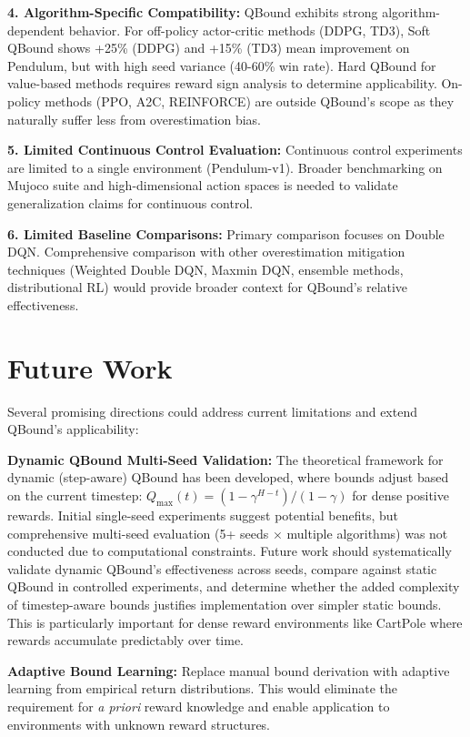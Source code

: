 \documentclass[11pt]{article}
\theoremstyle{definition}
\theoremstyle{remark}
\begin{document}
\textbf{4. Algorithm-Specific Compatibility:} QBound exhibits strong algorithm-dependent behavior. For off-policy actor-critic methods (DDPG, TD3), Soft QBound shows +25\% (DDPG) and +15\% (TD3) mean improvement on Pendulum, but with high seed variance (40-60\% win rate). Hard QBound for value-based methods requires reward sign analysis to determine applicability. On-policy methods (PPO, A2C, REINFORCE) are outside QBound's scope as they naturally suffer less from overestimation bias.

\textbf{5. Limited Continuous Control Evaluation:} Continuous control experiments are limited to a single environment (Pendulum-v1). Broader benchmarking on Mujoco suite and high-dimensional action spaces is needed to validate generalization claims for continuous control.

\textbf{6. Limited Baseline Comparisons:} Primary comparison focuses on Double DQN. Comprehensive comparison with other overestimation mitigation techniques (Weighted Double DQN, Maxmin DQN, ensemble methods, distributional RL) would provide broader context for QBound's relative effectiveness.

\section{Future Work}

Several promising directions could address current limitations and extend QBound's applicability:

\textbf{Dynamic QBound Multi-Seed Validation:} The theoretical framework for dynamic (step-aware) QBound has been developed, where bounds adjust based on the current timestep: $Q_{\max}(t) = (1-\gamma^{H-t})/(1-\gamma)$ for dense positive rewards. Initial single-seed experiments suggest potential benefits, but comprehensive multi-seed evaluation (5+ seeds $\times$ multiple algorithms) was not conducted due to computational constraints. Future work should systematically validate dynamic QBound's effectiveness across seeds, compare against static QBound in controlled experiments, and determine whether the added complexity of timestep-aware bounds justifies implementation over simpler static bounds. This is particularly important for dense reward environments like CartPole where rewards accumulate predictably over time.

\textbf{Adaptive Bound Learning:} Replace manual bound derivation with adaptive learning from empirical return distributions. This would eliminate the requirement for \textit{a priori} reward knowledge and enable application to environments with unknown reward structures.
\end{document}
